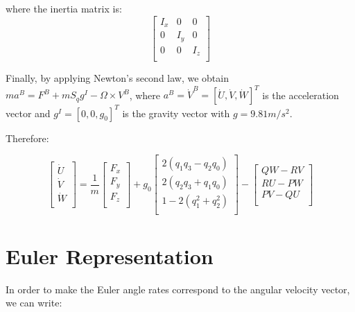 where the inertia matrix is:
\begin{equation}
\begin{bmatrix}
 	I_x & 0 & 0 \\
 	0 & I_y & 0 \\
 	0 & 0 & I_z \\
\end{bmatrix}
\end{equation}

Finally, by applying Newton's second law, we obtain $m a^{B}=F^{B}+m S_{q} g^{I} - \Omega \times V^{B}$, where $a^{B}=\dot{V}^{B}=[\dot{U}, \dot{V}, \dot{W}]^{T}$ is the acceleration vector and $g^{I}=[0, 0, g_{0}]^{T}$ is the gravity vector with $g=9.81m/s^{2}$.

Therefore:

\begin{equation}
\label{S10}
 \begin{bmatrix}
 	\dot{U} \\
 	\dot{V} \\
 	\dot{W} \\
 	\end{bmatrix}= \frac{1}{m}\begin{bmatrix}
 	F_{x}  \\
 	F_{y}   \\
 	F_{z}   \\
 	\end{bmatrix} + g_{0}\begin{bmatrix}
 	2(q_{1}q_{3}-q_{2}q_{0}) \\
 	2(q_{2}q_{3}+q_{1}q_{0}) \\
 	1-2(q_{1}^{2}+q_{2}^{2}) \\
 	\end{bmatrix} - \begin{bmatrix}
 	QW -RV \\
 	RU - PW \\
 	PV - QU \\
\end{bmatrix}
\end{equation}

\section{Euler Representation}
In order to make the Euler angle rates correspond to the angular velocity vector, we can write:

